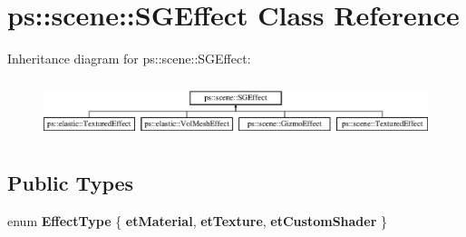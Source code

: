\hypertarget{classps_1_1scene_1_1SGEffect}{}\section{ps\+:\+:scene\+:\+:S\+G\+Effect Class Reference}
\label{classps_1_1scene_1_1SGEffect}
Inheritance diagram for ps\+:\+:scene\+:\+:S\+G\+Effect\+:\begin{figure}[H]
\begin{center}
\leavevmode
\includegraphics[height=1.707317cm]{classps_1_1scene_1_1SGEffect}
\end{center}
\end{figure}
\subsection*{Public Types}
\begin{DoxyCompactItemize}
\item 
\hypertarget{classps_1_1scene_1_1SGEffect_af8aa65adec9facbd6940d167509fc361}{}enum {\bfseries Effect\+Type} \{ {\bfseries et\+Material}, 
{\bfseries et\+Texture}, 
{\bfseries et\+Custom\+Shader}
 \}\label{classps_1_1scene_1_1SGEffect_af8aa65adec9facbd6940d167509fc361}

\end{DoxyCompactItemize}
